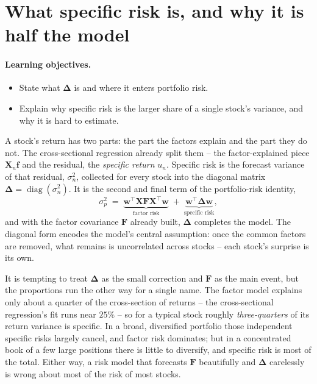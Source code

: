 \documentclass[11pt]{article}
\theoremstyle{definition}
\theoremstyle{plain}
\theoremstyle{remark}
\DeclareMathOperator{\diag}{diag}
\newcommand{\T}{^{\!\top}}
\newcommand{\wvec}{\mathbf{w}}
\newcommand{\Xmat}{\mathbf{X}}
\newcommand{\Fmat}{\mathbf{F}}
\newcommand{\Del}{\boldsymbol{\Delta}}
\newcommand{\fvec}{\mathbf{f}}
\begin{document}
\tableofcontents
\bigskip

\section{What specific risk is, and why it is half the model}\label{sec:what}

\paragraph{Learning objectives.}
\begin{itemize}[leftmargin=1.4em,topsep=2pt]
  \item State what $\Del$ is and where it enters portfolio risk.
  \item Explain why specific risk is the larger share of a single stock's variance, and why it is hard to estimate.
\end{itemize}

A stock's return has two parts: the part the factors explain and the part they do not. The cross-sectional regression already split them -- the factor-explained piece $\Xmat_n\fvec$ and the residual, the \emph{specific return} $u_n$. Specific risk is the forecast variance of that residual, $\sigma_n^2$, collected for every stock into the diagonal matrix $\Del=\diag(\sigma_n^2)$. It is the second and final term of the portfolio-risk identity,
\[
\sigma_p^2 \;=\; \underbrace{\wvec\T\Xmat\Fmat\Xmat\T\wvec}_{\text{factor risk}} \;+\; \underbrace{\wvec\T\Del\wvec}_{\text{specific risk}} ,
\]
and with the factor covariance $\Fmat$ already built, $\Del$ completes the model. The diagonal form encodes the model's central assumption: once the common factors are removed, what remains is uncorrelated across stocks -- each stock's surprise is its own.

It is tempting to treat $\Del$ as the small correction and $\Fmat$ as the main event, but the proportions run the other way for a single name. The factor model explains only about a quarter of the cross-section of returns -- the cross-sectional regression's fit runs near $25\%$ -- so for a typical stock roughly \emph{three-quarters} of its return variance is specific. In a broad, diversified portfolio those independent specific risks largely cancel, and factor risk dominates; but in a concentrated book of a few large positions there is little to diversify, and specific risk is most of the total. Either way, a risk model that forecasts $\Fmat$ beautifully and $\Del$ carelessly is wrong about most of the risk of most stocks.
\end{document}
